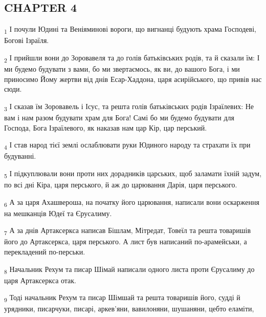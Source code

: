 \subsection{CHAPTER 4}
\begin{tcolorbox}
\textsubscript{1} І почули Юдині та Веніяминові вороги, що вигнанці будують храма Господеві, Богові Ізраїля.
\end{tcolorbox}
\begin{tcolorbox}
\textsubscript{2} І прийшли вони до Зоровавеля та до голів батьківських родів, та й сказали їм: І ми будемо будувати з вами, бо ми звертаємось, як ви, до вашого Бога, і ми приносимо Йому жертви від днів Есар-Хаддона, царя асирійського, що привів нас сюди.
\end{tcolorbox}
\begin{tcolorbox}
\textsubscript{3} І сказав їм Зоровавель і Ісус, та решта голів батьківських родів Ізраїлевих: Не вам і нам разом будувати храм для Бога! Самі бо ми будемо будувати для Господа, Бога Ізраїлевого, як наказав нам цар Кір, цар перський.
\end{tcolorbox}
\begin{tcolorbox}
\textsubscript{4} І став народ тієї землі ослаблювати руки Юдиного народу та страхати їх при будуванні.
\end{tcolorbox}
\begin{tcolorbox}
\textsubscript{5} І підкуплювали вони проти них дорадників царських, щоб заламати їхній задум, по всі дні Кіра, царя перського, й аж до царювання Дарія, царя перського.
\end{tcolorbox}
\begin{tcolorbox}
\textsubscript{6} А за царя Ахашвероша, на початку його царювання, написали вони оскарження на мешканців Юдеї та Єрусалиму.
\end{tcolorbox}
\begin{tcolorbox}
\textsubscript{7} А за днів Артаксеркса написав Бішлам, Мітредат, Товеїл та решта товаришів його до Артаксеркса, царя перського. А лист був написаний по-арамейськи, а перекладений по-перськи.
\end{tcolorbox}
\begin{tcolorbox}
\textsubscript{8} Начальник Рехум та писар Шімай написали одного листа проти Єрусалиму до царя Артаксеркса отак.
\end{tcolorbox}
\begin{tcolorbox}
\textsubscript{9} Тоді начальник Рехум та писар Шімшай та решта товаришів його, судді й урядники, писарчуки, писарі, аркев'яни, вавилоняни, шушаняни, цебто еламіти,
\end{tcolorbox}
